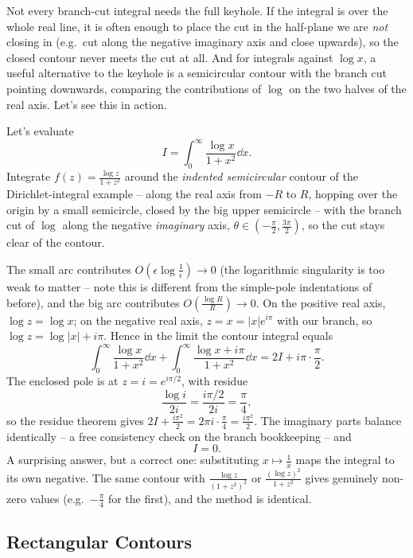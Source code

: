 \documentclass[a4paper]{scrartcl}
\begin{document}
Not every branch-cut integral needs the full keyhole. If the integral is over the whole real line, it is often enough to place the cut in the half-plane we are \emph{not} closing in (e.g.\ cut along the negative imaginary axis and close upwards), so the closed contour never meets the cut at all. And for integrals against $\log x$, a useful alternative to the keyhole is a semicircular contour with the branch cut pointing downwards, comparing the contributions of $\log$ on the two halves of the real axis. Let's see this in action.

\begin{example}
	Let's evaluate
	$$
	I = \int_0^\infty \frac{\log x}{1 + x^2} \dd x.
	$$
	Integrate $f(z) = \frac{\log z}{1 + z^2}$ around the \emph{indented semicircular} contour of the Dirichlet-integral example -- along the real axis from $-R$ to $R$, hopping over the origin by a small semicircle, closed by the big upper semicircle -- with the branch cut of $\log$ along the negative \emph{imaginary} axis, $\theta \in (-\frac \pi 2, \frac{3\pi}{2})$, so the cut stays clear of the contour.

	The small arc contributes $O(\epsilon \log \frac{1}{\epsilon}) \to 0$ (the logarithmic singularity is too weak to matter -- note this is different from the simple-pole indentations of before), and the big arc contributes $O\left(\frac{\log R}{R}\right) \to 0$. On the positive real axis, $\log z = \log x$; on the negative real axis, $z = x = |x| e^{i\pi}$ with our branch, so $\log z = \log |x| + i\pi$. Hence in the limit the contour integral equals
	$$
	\int_0^\infty \frac{\log x}{1 + x^2}\dd x + \int_0^\infty \frac{\log x + i\pi}{1 + x^2} \dd x = 2I + i\pi \cdot \frac{\pi}{2}.
	$$
	The enclosed pole is at $z = i = e^{i\pi/2}$, with residue
	$$
	\frac{\log i}{2i} = \frac{i\pi/2}{2i} = \frac{\pi}{4},
	$$
	so the residue theorem gives $2I + \frac{i\pi^2}{2} = 2\pi i \cdot \frac \pi 4 = \frac{i \pi^2}{2}$. The imaginary parts balance identically -- a free consistency check on the branch bookkeeping -- and
	$$
	I = 0.
	$$
	A surprising answer, but a correct one: substituting $x \mapsto \frac 1x$ maps the integral to its own negative. The same contour with $\frac{\log z}{(1+z^2)^2}$ or $\frac{(\log z)^2}{1 + z^2}$ gives genuinely non-zero values (e.g.\ $-\frac{\pi}{4}$ for the first), and the method is identical.
\end{example}

\subsection{Rectangular Contours}
\end{document}
